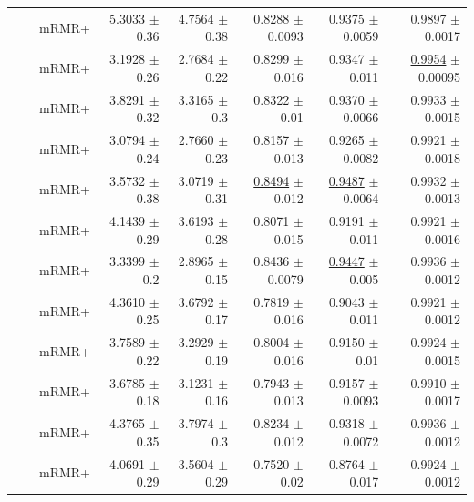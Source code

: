 \begin{longtable}{llp{}rrrrr}
 &  & mRMR+ & 5.3033 {\scriptsize $\pm$ 0.36} & 4.7564 {\scriptsize $\pm$ 0.38} & 0.8288 {\scriptsize $\pm$ 0.0093} & 0.9375 {\scriptsize $\pm$ 0.0059} & 0.9897 {\scriptsize $\pm$ 0.0017} \\
 &  & mRMR+ & 3.1928 {\scriptsize $\pm$ 0.26} & 2.7684 {\scriptsize $\pm$ 0.22} & 0.8299 {\scriptsize $\pm$ 0.016} & 0.9347 {\scriptsize $\pm$ 0.011} & \underline{0.9954} {\scriptsize $\pm$ 0.00095} \\
 &  & mRMR+ & 3.8291 {\scriptsize $\pm$ 0.32} & 3.3165 {\scriptsize $\pm$ 0.3} & 0.8322 {\scriptsize $\pm$ 0.01} & 0.9370 {\scriptsize $\pm$ 0.0066} & 0.9933 {\scriptsize $\pm$ 0.0015} \\
 &  & mRMR+ & 3.0794 {\scriptsize $\pm$ 0.24} & 2.7660 {\scriptsize $\pm$ 0.23} & 0.8157 {\scriptsize $\pm$ 0.013} & 0.9265 {\scriptsize $\pm$ 0.0082} & 0.9921 {\scriptsize $\pm$ 0.0018} \\
 &  & mRMR+ & 3.5732 {\scriptsize $\pm$ 0.38} & 3.0719 {\scriptsize $\pm$ 0.31} & \underline{0.8494} {\scriptsize $\pm$ 0.012} & \underline{0.9487} {\scriptsize $\pm$ 0.0064} & 0.9932 {\scriptsize $\pm$ 0.0013} \\
 &  & mRMR+ & 4.1439 {\scriptsize $\pm$ 0.29} & 3.6193 {\scriptsize $\pm$ 0.28} & 0.8071 {\scriptsize $\pm$ 0.015} & 0.9191 {\scriptsize $\pm$ 0.011} & 0.9921 {\scriptsize $\pm$ 0.0016} \\
 &  & mRMR+ & 3.3399 {\scriptsize $\pm$ 0.2} & 2.8965 {\scriptsize $\pm$ 0.15} & 0.8436 {\scriptsize $\pm$ 0.0079} & \underline{0.9447} {\scriptsize $\pm$ 0.005} & 0.9936 {\scriptsize $\pm$ 0.0012} \\
 &  & mRMR+ & 4.3610 {\scriptsize $\pm$ 0.25} & 3.6792 {\scriptsize $\pm$ 0.17} & 0.7819 {\scriptsize $\pm$ 0.016} & 0.9043 {\scriptsize $\pm$ 0.011} & 0.9921 {\scriptsize $\pm$ 0.0012} \\
 &  & mRMR+ & 3.7589 {\scriptsize $\pm$ 0.22} & 3.2929 {\scriptsize $\pm$ 0.19} & 0.8004 {\scriptsize $\pm$ 0.016} & 0.9150 {\scriptsize $\pm$ 0.01} & 0.9924 {\scriptsize $\pm$ 0.0015} \\
 &  & mRMR+ & 3.6785 {\scriptsize $\pm$ 0.18} & 3.1231 {\scriptsize $\pm$ 0.16} & 0.7943 {\scriptsize $\pm$ 0.013} & 0.9157 {\scriptsize $\pm$ 0.0093} & 0.9910 {\scriptsize $\pm$ 0.0017} \\
 &  & mRMR+ & 4.3765 {\scriptsize $\pm$ 0.35} & 3.7974 {\scriptsize $\pm$ 0.3} & 0.8234 {\scriptsize $\pm$ 0.012} & 0.9318 {\scriptsize $\pm$ 0.0072} & 0.9936 {\scriptsize $\pm$ 0.0012} \\
 &  & mRMR+ & 4.0691 {\scriptsize $\pm$ 0.29} & 3.5604 {\scriptsize $\pm$ 0.29} & 0.7520 {\scriptsize $\pm$ 0.02} & 0.8764 {\scriptsize $\pm$ 0.017} & 0.9924 {\scriptsize $\pm$ 0.0012} \\

\end{longtable}
